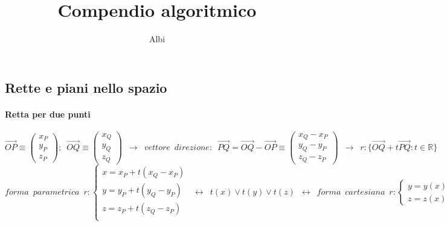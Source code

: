 \documentclass[10pt]{article}
\title{Compendio algoritmico}
\author{Albi}
\date{}
\theoremstyle{plain}
\begin{document}
\maketitle
\small
\thispagestyle{empty}
\subsection*{Rette e piani nello spazio}

\paragraph{Retta per due punti} 
\[\Vec{OP} \equiv \begin{pmatrix}
    x_P\\ y_P \\ z_P
\end{pmatrix}; \enspace \Vec{OQ} \equiv \begin{pmatrix}
    x_Q\\ y_Q \\ z_Q
\end{pmatrix} \enspace \rightarrow \enspace vettore \enspace direzione: \enspace \Vec{PQ} = \Vec{OQ} - \Vec{OP} \equiv \begin{pmatrix}
    x_Q - x_P\\ y_Q - y_P \\ z_Q - z_P
\end{pmatrix} \enspace \rightarrow \enspace r: \{\Vec{OQ} + t \Vec{PQ} : t \in \mathbb{R}\}\]
\[forma \enspace parametrica \enspace r: \begin{cases}
    x = x_P + t (x_Q - x_P)\\
    y = y_P + t (y_Q - y_P)\\
    z = z_P + t (z_Q - z_P)\\
\end{cases} \enspace \longleftrightarrow \enspace t(x) \lor t(y) \lor t(z) \enspace \longleftrightarrow \enspace forma \enspace cartesiana \enspace r: \begin{cases}
    y = y (x)\\
    z = z (x)
\end{cases}\]
\end{document}
